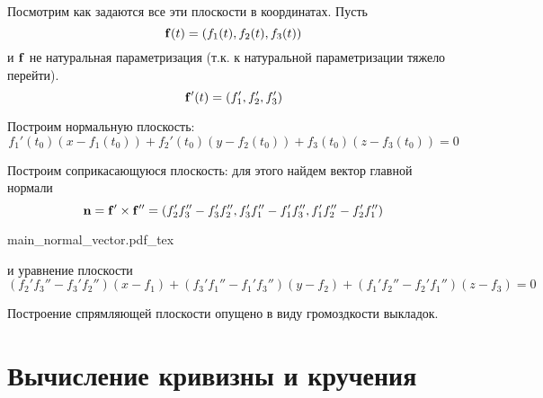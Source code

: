 \documentclass[main]{subfiles}
\begin{document}
Посмотрим как задаются все эти плоскости в координатах.
Пусть
\[\mathbf{f}(t) = (f_1(t), f_2(t), f_3(t))\]
и $\mathbf{f}$ не натуральная параметризация (т.к. к натуральной параметризации тяжело перейти).
\[\mathbf{f}'(t) = (f_1',f_2',f_3')\]

Построим нормальную плоскость:
\[f_1'(t_0)(x - f_1(t_0)) + f_2'(t_0)(y - f_2(t_0)) + f_3(t_0)(z - f_3(t_0)) = 0\]

Построим соприкасающуюся плоскость:
для этого найдем вектор главной нормали
\[\mathbf{n} = \mathbf{f}' \times \mathbf{f}'' = (f_2'f_3'' - f_3'f_2'',f_3'f_1'' - f_1'f_3'', f_1'f_2'' - f_2'f_1'')\]
\begin{center}
    {main_normal_vector.pdf_tex}
\end{center}
и уравнение плоскости
\[(f_2'f_3'' - f_3'f_2'')(x - f_1) + (f_3'f_1'' - f_1'f_3'')(y - f_2) + (f_1'f_2'' - f_2'f_1'')(z - f_3) = 0\]

Построение спрямляющей плоскости опущено в виду громоздкости выкладок.

\section{Вычисление кривизны и кручения}
\end{document}
